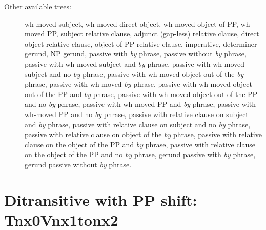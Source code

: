 \begin{description}
\item[Other available trees:] wh-moved subject, wh-moved direct object,
wh-moved object of PP, wh-moved PP, subject relative clause, adjunct (gap-less) relative clause, direct object
relative clause, object of PP relative clause, imperative, determiner
gerund, NP gerund, passive with {\it by} phrase, passive without {\it by}
phrase, passive with wh-moved subject and {\it by} phrase, passive with
wh-moved subject and no {\it by} phrase, passive with wh-moved object out
of the {\it by} phrase, passive with wh-moved {\it by} phrase, passive with
wh-moved object out of the PP and {\it by} phrase, passive with wh-moved
object out of the PP and no {\it by} phrase, passive with wh-moved PP and
{\it by} phrase, passive with wh-moved PP and no {\it by} phrase, passive
with relative clause on subject and {\it by} phrase, passive with relative
clause on subject and no {\it by} phrase, passive with relative clause on
object of the {\it by} phrase, passive with relative clause on the object
of the PP and {\it by} phrase, passive with relative clause on the object
of the PP and no {\it by} phrase, gerund passive with {\it by} phrase,
gerund passive without {\it by} phrase.

\end{description}




\section{Ditransitive with PP shift: Tnx0Vnx1tonx2}
\label{nx0Vnx1Pnx2-family}

